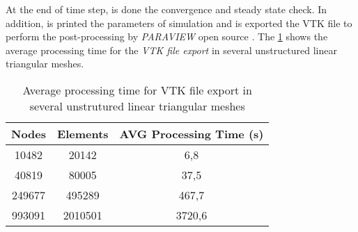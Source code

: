 \medskip
At the end of time step, is done the convergence and steady state check.
In addition, is printed the parameters of simulation and
is exported the VTK file to perform the post-processing by
\textit{PARAVIEW} open source \cite{paraview}. 
The \ref{tempo export vtk} 
shows the average processing time for the \textit{VTK file export}
in several unstructured linear triangular meshes.

\vspace{0.5cm}
\begin{table}[H]
\centering
\begin{tabular}{ccc}
\toprule
\textbf{Nodes} & \textbf{Elements} & \textbf{AVG Processing Time} (s) \\
\midrule
10482 & 20142 & 6,8 \\
40819 & 80005 & 37,5 \\
249677 & 495289 & 467,7 \\
993091 & 2010501 & 3720,6 \\
\bottomrule
\end{tabular}
\caption{Average processing time for VTK file export in several unstrutured linear triangular meshes}
\label{tempo export vtk}
\end{table}


